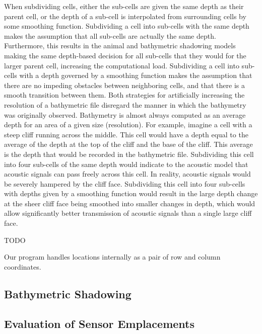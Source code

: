 When subdividing cells, either the sub-cells are given the same depth as their parent cell, or the depth of a sub-cell is interpolated from surrounding cells by some smoothing function.  Subdividing a cell into sub-cells with the same depth makes the assumption that all sub-cells are actually the same depth.  Furthermore, this results in the animal and bathymetric shadowing models making the same depth-based decision for all sub-cells that they would for the larger parent cell, increasing the computational load.  Subdividing a cell into sub-cells with a depth governed by a smoothing function makes the assumption that there are no impeding obstacles between neighboring cells, and that there is a smooth transition between them.  Both strategies for artificially increasing the resolution of a bathymetric file disregard the manner in which the bathymetry was originally observed.  Bathymetry is almost always computed as an average depth for an area of a given size (resolution).  For example, imagine a cell with a steep cliff running across the middle.  This cell would have a depth equal to the average of the depth at the top of the cliff and the base of the cliff.  This average is the depth that would be recorded in the bathymetric file.  Subdividing this cell into four sub-cells of the same depth would indicate to the acoustic model that acoustic signals can pass freely across this cell.  In reality, acoustic signals would be severely hampered by the cliff face.  Subdividing this cell into four sub-cells with depths given by a smoothing function would result in the large depth change at the sheer cliff face being smoothed into smaller changes in depth, which would allow significantly better transmission of acoustic signals than a single large cliff face.

TODO



Our program handles locations internally as a pair of row and column coordinates.


\subsection{Bathymetric Shadowing}




\subsection{Evaluation of Sensor Emplacements}



